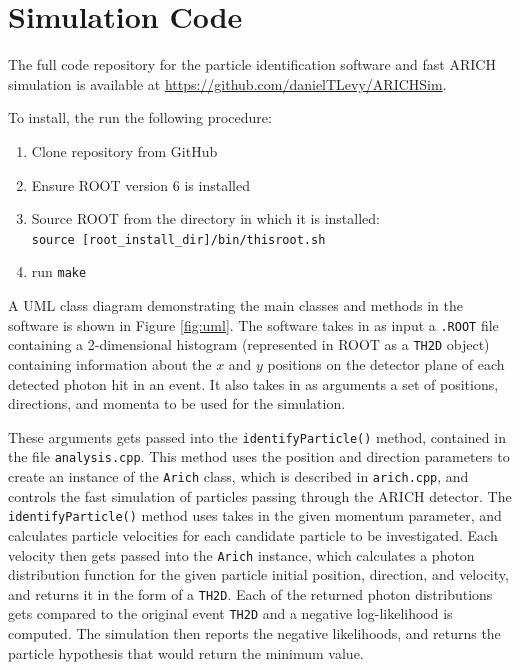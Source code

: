 
\chapter{Simulation Code}

The full code repository for the particle identification software and fast ARICH simulation is available at \url{https://github.com/danielTLevy/ARICHSim}.

To install, the run the following procedure:

\begin{enumerate}
\item Clone repository from GitHub
\item Ensure ROOT version 6 is installed
\item Source ROOT from the directory in which it is installed: \\ \verb!source [root_install_dir]/bin/thisroot.sh!
\item run \verb!make!
\end{enumerate}

A UML class diagram demonstrating the main classes and methods in the software is shown in Figure \ref{fig:uml}. 
The software takes in as input a \verb!.ROOT! file containing a 2-dimensional histogram (represented in ROOT as a \verb!TH2D! object) containing information about the $x$ and $y$ positions on the detector plane of each detected photon hit in an event.
It also takes in as arguments a set of positions, directions, and momenta to be used for the simulation.

These arguments gets passed into the \verb!identifyParticle()! method, contained in the file \verb!analysis.cpp!.
This method uses the position and direction parameters to create an instance of the \verb!Arich! class, which is described in \verb!arich.cpp!, and controls the fast simulation of particles passing through the ARICH detector.
The \verb!identifyParticle()! method uses takes in the given momentum parameter, and calculates particle velocities for each candidate particle to be investigated.
Each velocity then gets passed into the \verb!Arich! instance, which calculates a photon distribution function for the given particle initial position, direction, and velocity, and returns it in the form of a \verb!TH2D!.
Each of the returned photon distributions gets compared to the original event \verb!TH2D! and a negative log-likelihood is computed.
The simulation then reports the negative likelihoods, and returns the particle hypothesis that would return the minimum value.

